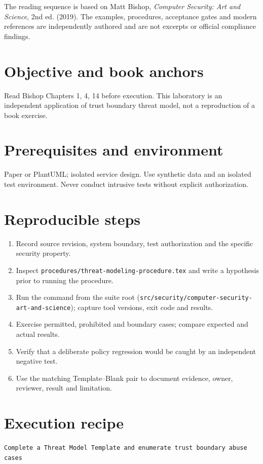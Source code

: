 \documentclass[10pt,letterpaper]{article}
\begin{document}
\makedoctocpage
\begin{notebox}
The reading sequence is based on Matt Bishop, \emph{Computer Security: Art and Science}, 2nd ed. (2019). The examples, procedures, acceptance gates and modern references are independently authored and are not excerpts or official compliance findings.
\end{notebox}
\section{Objective and book anchors}
Read Bishop Chapters 1, 4, 14 before execution. This laboratory is an independent application of trust boundary threat model, not a reproduction of a book exercise.
\section{Prerequisites and environment}
Paper or PlantUML; isolated service design. Use synthetic data and an isolated test environment. Never conduct intrusive tests without explicit authorization.
\section{Reproducible steps}
\begin{enumerate}
\item Record source revision, system boundary, test authorization and the specific security property.
\item Inspect \texttt{procedures/threat-modeling-procedure.tex} and write a hypothesis prior to running the procedure.
\item Run the command from the suite root (\texttt{src/security/computer-security-art-and-science}); capture tool versions, exit code and results.
\item Exercise permitted, prohibited and boundary cases; compare expected and actual results.
\item Verify that a deliberate policy regression would be caught by an independent negative test.
\item Use the matching Template--Blank pair to document evidence, owner, reviewer, result and limitation.
\end{enumerate}
\section{Execution recipe}
\begin{viewbox}\raggedright\small\texttt{Complete a Threat Model Template and enumerate trust boundary abuse cases}\end{viewbox}
\end{document}
